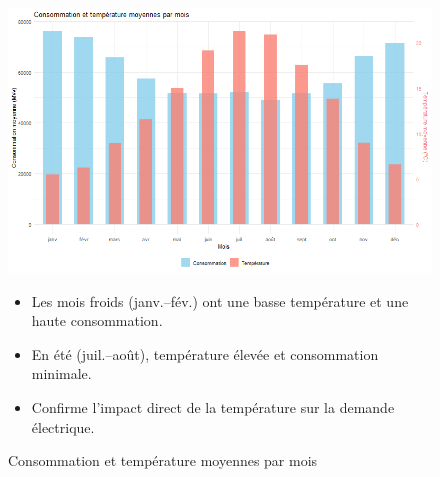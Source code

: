 \documentclass[12pt,a4paper]{article}
\begin{document}
\begin{figure}[H]
  \centering
  \begin{minipage}[t]{0.9\textwidth}
    \centering
    \includegraphics[width=\linewidth]{Projet_partie_A/conso_temp_moyennes_par_mois_superpose.png}
    \caption{Consommation et température moyennes par mois}
    \label{fig:conso_temp_mois}
  \end{minipage}
    \begin{itemize}
      \item Les mois froids (janv.–fév.) ont une basse température et une haute consommation.  
      \item En été (juil.–août), température élevée et consommation minimale.  
      \item Confirme l’impact direct de la température sur la demande électrique.  
    \end{itemize}
\end{figure}
\end{document}
